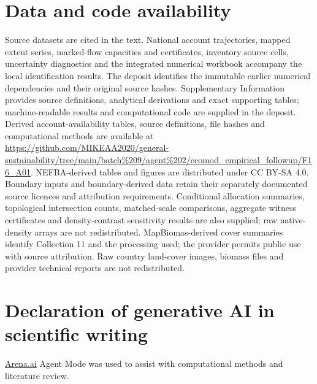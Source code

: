 \documentclass[11pt,a4paper]{article}
\begin{document}
\section*{Data and code availability}
Source datasets are cited in the text. National account trajectories, mapped extent series, marked-flow capacities and certificates, inventory source cells, uncertainty diagnostics and the integrated numerical workbook accompany the local identification results. The deposit identifies the immutable earlier numerical dependencies and their original source hashes. Supplementary Information provides source definitions, analytical derivations and exact supporting tables; machine-readable results and computational code are supplied in the deposit. Derived account-availability tables, source definitions, file hashes and computational methods are available at \url{https://github.com/MIKEAA2020/general-sustainability/tree/main/batch%209/agent%202/ecomod_empirical_followup/F16_A01}. NEFBA-derived tables and figures are distributed under CC BY-SA 4.0. Boundary inputs and boundary-derived data retain their separately documented source licences and attribution requirements. Conditional allocation summaries, topological intersection counts, matched-scale comparisons, aggregate witness certificates and density-contrast sensitivity results are also supplied; raw native-density arrays are not redistributed. MapBiomas-derived cover summaries identify Collection 11 and the processing used; the provider permits public use with source attribution. Raw country land-cover images, biomass files and provider technical reports are not redistributed.

\section*{Declaration of generative AI in scientific writing}
\href{http://Arena.ai}{Arena.ai} Agent Mode was used to assist with computational methods and literature review.
\end{document}
